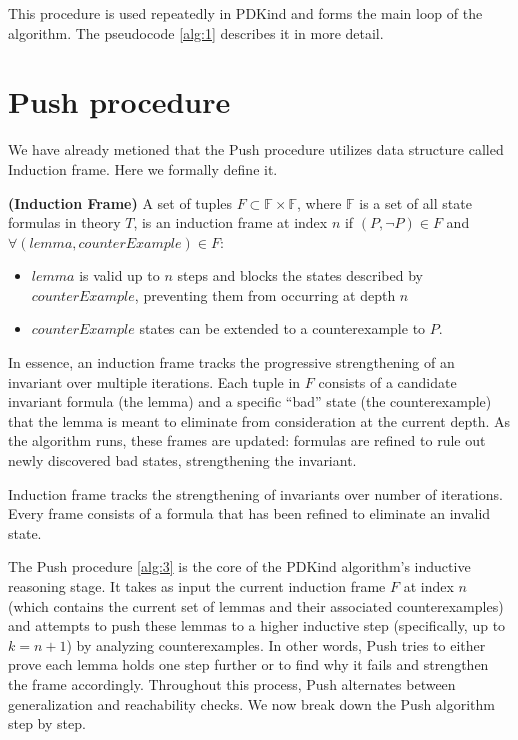 This procedure is used repeatedly in PDKind and forms the main loop of the algorithm. The pseudocode \ref{alg:1} describes it in more detail.



\section{Push procedure} \label{Push}
We have already metioned that the Push procedure utilizes data structure called Induction frame. Here we formally define it. 

\vspace{\baselineskip}
\begin{definition}{\textbf{(Induction Frame)}}
    \cite{7886665}\label{def:IFrame} A set of tuples $F \subset \mathbb{F} \times \mathbb{F}$, where $\mathbb{F}$ is a set of all state formulas in theory $T$, is an induction frame at index $n$ if $(P, \neg P) \in F$ and $\forall (lemma, counterExample) \in F$:
    \begin{itemize}
        \item $lemma$ is valid up to $n$ steps  and blocks the states described by \\ \( counterExample \), preventing them from occurring at depth \( n \)
        \item $counterExample$ states can be extended to a counterexample to $P$.
    \end{itemize}
\end{definition}
In essence, an induction frame tracks the progressive strengthening of an
invariant over multiple iterations. Each tuple in $F$ consists of a candidate
invariant formula (the lemma) and a specific “bad” state (the counterexample)
that the lemma is meant to eliminate from consideration at the current depth.
As the algorithm runs, these frames are updated: formulas are refined to rule
out newly discovered bad states, strengthening the invariant.

\vspace{\baselineskip}
\noindent Induction frame tracks the strengthening of invariants over number of iterations. Every frame consists of a formula that has been refined to eliminate an invalid state.

The Push procedure \ref{alg:3} is the core of the PDKind algorithm’s
inductive reasoning stage. It takes as input the current induction frame $F$ at
index $n$ (which contains the current set of lemmas and their associated
counterexamples) and attempts to push these lemmas to a higher inductive
step (specifically, up to $k = n+1$) by analyzing counterexamples. In other
words, Push tries to either prove each lemma holds one step further or to find
why it fails and strengthen the frame accordingly. Throughout this process,
Push alternates between generalization and reachability checks.
We now break down the Push algorithm step by step.

